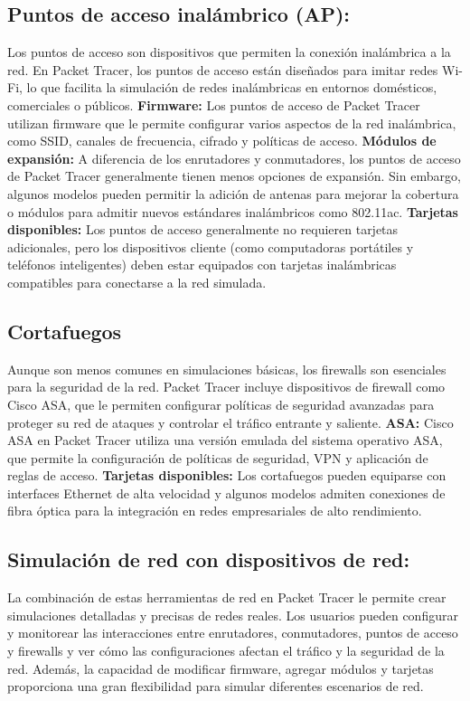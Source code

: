 \documentclass[a4paper,12pt]{article}
\begin{document}
\subsection{Puntos de acceso inalámbrico (AP):}
Los puntos de acceso son dispositivos que permiten la conexión inalámbrica a la red. En Packet Tracer, los puntos de acceso están diseñados para imitar redes Wi-Fi, lo que facilita la simulación de redes inalámbricas en entornos domésticos, comerciales o públicos.
\textbf{Firmware:} 
Los puntos de acceso de Packet Tracer utilizan firmware que le permite configurar varios aspectos de la red inalámbrica, como SSID, canales de frecuencia, cifrado y políticas de acceso. 
\textbf{Módulos de expansión:}
A diferencia de los enrutadores y conmutadores, los puntos de acceso de Packet Tracer generalmente tienen menos opciones de expansión. Sin embargo, algunos modelos pueden permitir la adición de antenas para mejorar la cobertura o módulos para admitir nuevos estándares inalámbricos como 802.11ac.
\textbf{Tarjetas disponibles:} 
Los puntos de acceso generalmente no requieren tarjetas adicionales, pero los dispositivos cliente (como computadoras portátiles y teléfonos inteligentes) deben estar equipados con tarjetas inalámbricas compatibles para conectarse a la red simulada.
\subsection{Cortafuegos}
Aunque son menos comunes en simulaciones básicas, los firewalls son esenciales para la seguridad de la red. Packet Tracer incluye dispositivos de firewall como Cisco ASA, que le permiten configurar políticas de seguridad avanzadas para proteger su red de ataques y controlar el tráfico entrante y saliente. 
\textbf{ASA:} 
Cisco ASA en Packet Tracer utiliza una versión emulada del sistema operativo ASA, que permite la configuración de políticas de seguridad, VPN y aplicación de reglas de acceso.
\textbf{Tarjetas disponibles:}
Los cortafuegos pueden equiparse con interfaces Ethernet de alta velocidad y algunos modelos admiten conexiones de fibra óptica para la integración en redes empresariales de alto rendimiento.
\subsection{Simulación de red con dispositivos de red:}
La combinación de estas herramientas de red en Packet Tracer le permite crear simulaciones detalladas y precisas de redes reales. Los usuarios pueden configurar y monitorear las interacciones entre enrutadores, conmutadores, puntos de acceso y firewalls y ver cómo las configuraciones afectan el tráfico y la seguridad de la red. Además, la capacidad de modificar firmware, agregar módulos y tarjetas proporciona una gran flexibilidad para simular diferentes escenarios de red.
\end{document}
